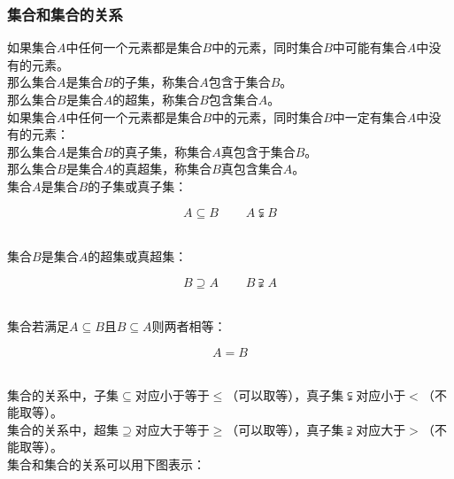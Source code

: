 \documentclass[UTF8]{ctexart}
\begin{document}
\newpage

\subsubsection{集合和集合的关系}
    如果集合$A$中任何一个元素都是集合$B$中的元素，同时集合$B$中可能有集合$A$中没有的元素。\\[3mm]
    那么集合$A$是集合$B$的子集，称集合$A$包含于集合$B$。\\[3mm]
    那么集合$B$是集合$A$的超集，称集合$B$包含集合$A$。\\[6mm]
    如果集合$A$中任何一个元素都是集合$B$中的元素，同时集合$B$中一定有集合$A$中没有的元素：\\[3mm]
    那么集合$A$是集合$B$的真子集，称集合$A$真包含于集合$B$。\\[3mm]
    那么集合$B$是集合$A$的真超集，称集合$B$真包含集合$A$。\\[6mm]
    集合$A$是集合$B$的子集或真子集：
    \begin{large}
        \begin{equation*}
            A\subseteq B~~~~~~~~~~A\subsetneqq B
        \end{equation*}
    \end{large}\\
    集合$B$是集合$A$的超集或真超集：
    \begin{large}
        \begin{equation*}
            B\supseteq A~~~~~~~~~~B\supsetneqq A
        \end{equation*}
    \end{large}\\
    集合若满足$A\subseteq B$且$B\subseteq A$则两者相等：
    \begin{large}
        \begin{equation*}
            A=B
        \end{equation*}
    \end{large}\\
    集合的关系中，子集$\subseteq$对应小于等于$\leq$（可以取等），真子集$\subsetneqq$对应小于$<$（不能取等）。\\[3mm]
    集合的关系中，超集$\supseteq$对应大于等于$\geq$（可以取等），真子集$\supsetneqq$对应大于$>$（不能取等）。\\[6mm]
    集合和集合的关系可以用下图表示：
\end{document}
